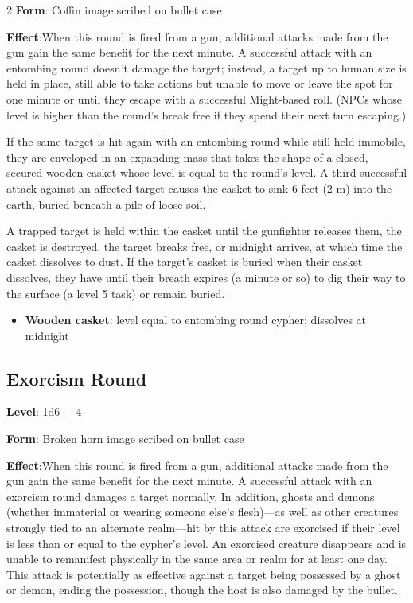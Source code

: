 \begin{multicols}{2}
\textbf{Form}: Coffin image scribed on bullet case 

\textbf{Effect}:When this round is fired from a gun, additional attacks made from the gun gain the same benefit for the next minute. A successful attack with an entombing round doesn’t damage the target; instead, a target up to human size is held in place, still able to take actions but unable to move or leave the spot for one minute or until they escape with a successful Might‑based roll. (NPCs whose level is higher than the round’s break free if they spend their next turn escaping.) 

If the same target is hit again with an entombing round while still held immobile, they are enveloped in an expanding mass that takes the shape of a closed, secured wooden casket whose level is equal to the round’s level. A third successful attack against an affected target causes the casket to sink 6 feet (2 m) into the earth, buried beneath a pile of loose soil. 

A trapped target is held within the casket until the gunfighter releases them, the casket is destroyed, the target breaks free, or midnight arrives, at which time the casket dissolves to dust. If the target’s casket is buried when their casket dissolves, they have until their breath expires (a minute or so) to dig their way to the surface (a level 5 task) or remain buried.

\begin{itemize}
\item \textbf{Wooden casket}: level equal to entombing round cypher; dissolves at midnight
\end{itemize}

\subsection{Exorcism Round}

\textbf{Level}: 1d6 + 4 

\textbf{Form}: Broken horn image scribed on bullet case 

\textbf{Effect}:When this round is fired from a gun, additional attacks made from the gun gain the same benefit for the next minute. A successful attack with an exorcism round damages a target normally. In addition, ghosts and demons (whether immaterial or wearing someone else’s flesh)—as well as other creatures strongly tied to an alternate realm—hit by this attack are exorcised if their level is less than or equal to the cypher’s level. An exorcised creature disappears and is unable to remanifest physically in the same area or realm for at least one day. 
This attack is potentially as effective against a target being possessed by a ghost or demon, ending the possession, though the host is also damaged by the bullet.


\end{multicols}
